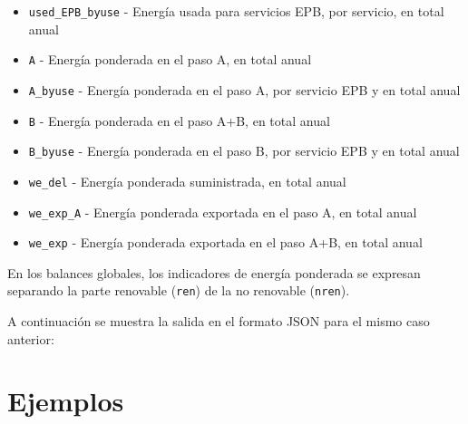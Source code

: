 \documentclass[10pt,notitlepage,oneside,a4paper]{article}
\begin{document}
\begin{itemize}
\item \texttt{used\_EPB\_byuse} - Energía usada para servicios EPB, por servicio, en total anual
\item \texttt{A} - Energía ponderada en el paso A, en total anual
\item \texttt{A\_byuse} - Energía ponderada en el paso A, por servicio EPB y en total anual
\item \texttt{B} - Energía ponderada en el paso A+B, en total anual
\item \texttt{B\_byuse} - Energía ponderada en el paso B, por servicio EPB y en total anual
\item \texttt{we\_del} - Energía ponderada suministrada, en total anual
\item \texttt{we\_exp\_A} - Energía ponderada exportada en el paso A, en total anual
\item \texttt{we\_exp} - Energía ponderada exportada en el paso A+B, en total anual
\end{itemize}

En los balances globales, los indicadores de energía ponderada se expresan separando la parte renovable (\texttt{ren}) de la no renovable (\texttt{nren}).

A continuación se muestra la salida en el formato JSON para el mismo caso anterior:



\clearpage
\newpage


\setcounter{section}{0} %
\renewcommand\thesection{Anexo~\Roman{section}}
\renewcommand\theHsection{Anexo~\Roman{section}}
\renewcommand\thesubsection{\Roman{section}.\arabic{subsection}}
\renewcommand\theHsubsection{\Roman{section}.\arabic{subsection}}
\renewcommand{\thefigure}{\Roman{section}.\arabic{figure}}
\renewcommand{\theHfigure}{\Roman{section}.\arabic{figure}}
\renewcommand{\thetable}{\Roman{section}.\arabic{table}}
\renewcommand{\theHtable}{\Roman{section}.\arabic{table}}

\section{Ejemplos}
\label{sec:anexoejemplos}
\setcounter{figure}{0} %
\setcounter{table}{0} %
\end{document}
